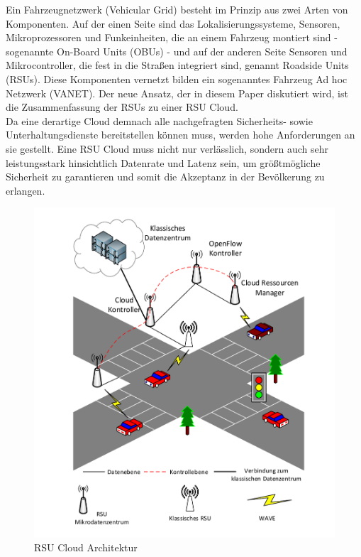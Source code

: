 \documentclass[conference]{IEEEtran}
\begin{document}
Ein Fahrzeugnetzwerk (Vehicular Grid) besteht im Prinzip aus zwei Arten von Komponenten. Auf der einen Seite sind das Lokalisierungssysteme, Sensoren, Mikroprozessoren und Funkeinheiten, die an einem Fahrzeug montiert sind - sogenannte On-Board Units (OBUs) - und auf der anderen Seite  Sensoren und Mikrocontroller, die fest in die Straßen integriert sind, genannt Roadside Units (RSUs). Diese Komponenten vernetzt bilden ein sogenanntes Fahrzeug Ad hoc Netzwerk (VANET). Der neue Ansatz, der in diesem Paper diskutiert wird, ist die Zusammenfassung der RSUs zu einer RSU Cloud.\\
Da eine derartige Cloud demnach alle nachgefragten Sicherheits- sowie Unterhaltungsdienste bereitstellen können muss, werden hohe Anforderungen an sie gestellt. Eine RSU Cloud muss nicht nur verlässlich, sondern auch sehr leistungsstark hinsichtlich Datenrate und Latenz sein, um größtmögliche Sicherheit zu garantieren und somit die Akzeptanz in der Bevölkerung zu erlangen.\\

\begin{figure}[h!]
	\centering
	\includegraphics[trim=1.5cm 0 0 0.8cm, scale=0.66]{grafik/strasse.pdf}
	\caption{RSU Cloud Architektur}
	\label{img:grafik-dummy}
\end{figure}
\end{document}
